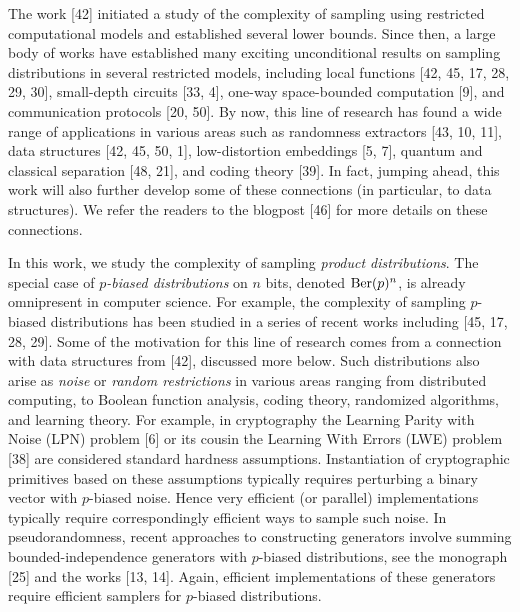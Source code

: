\documentclass[10pt,a4paper]{article}
\begin{document}
The work [42] initiated a study of the complexity of sampling using restricted computational models and established several lower bounds.
Since then, a large body of works have established many exciting unconditional results on sampling distributions in several restricted models, including local functions [42, 45, 17, 28, 29, 30], small-depth circuits [33, 4], one-way space-bounded computation [9], and communication protocols [20, 50].
By now, this line of research has found a wide range of applications in various areas such as randomness extractors [43, 10, 11], data structures [42, 45, 50, 1], low-distortion embeddings [5, 7], quantum and classical separation [48, 21], and coding theory [39]. In fact, jumping ahead, this work will also further develop some of these connections (in particular, to data structures). We refer the readers to the blogpost [46] for more details on these connections.\par




In this work, we study the complexity of sampling \emph{product distributions}. The special case of \emph{$p$-biased distributions} on $n$ bits, denoted $\textnormal{Ber}(p)^{n}$, is already omnipresent in computer science. For example, the complexity of sampling $p$-biased distributions has been studied in a series of recent works including [45, 17, 28, 29]. Some of the motivation for this line of research comes from a connection with data structures from [42], discussed more below. Such distributions also arise as \emph{noise} or \emph{random restrictions} in various areas ranging from distributed computing, to Boolean function analysis, coding theory, randomized algorithms, and learning theory. For example, in cryptography
the Learning Parity with Noise (LPN) problem [6] or its cousin the Learning With Errors (LWE) problem [38] are considered standard hardness assumptions. Instantiation of cryptographic primitives based on these assumptions typically requires perturbing a binary vector with $p$-biased noise. Hence very efficient (or parallel) implementations typically require correspondingly efficient ways to sample such noise.
In pseudorandomness, recent approaches to constructing generators involve summing bounded-independence generators with $p$-biased distributions, see the monograph [25] and the works [13, 14]. Again, efficient implementations of these generators require efficient samplers for $p$-biased distributions.\par
\end{document}
